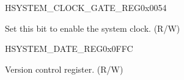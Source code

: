 \begin{register}{H}{SYSTEM\_CLOCK\_GATE\_REG}{0x0054}\label{regdesc:SYSTEMCLOCKGATEREG}
%
%
\regnewline%
\begin{regdesc}\begin{reglist}
\label{fielddesc:SYSTEMCLKEN}\item [SYSTEM\_CLK\_EN] Set this bit to enable the system clock. (R/W)
\end{reglist}\end{regdesc}
\end{register}


\begin{register}{H}{SYSTEM\_DATE\_REG}{0x0FFC}\label{regdesc:SYSTEMDATEREG}
%
%
\regnewline%
\begin{regdesc}\begin{reglist}
\label{fielddesc:SYSTEMSYSTEMREGDATE}\item [SYSTEM\_DATE] Version control register. (R/W)
\end{reglist}\end{regdesc}
\end{register}


